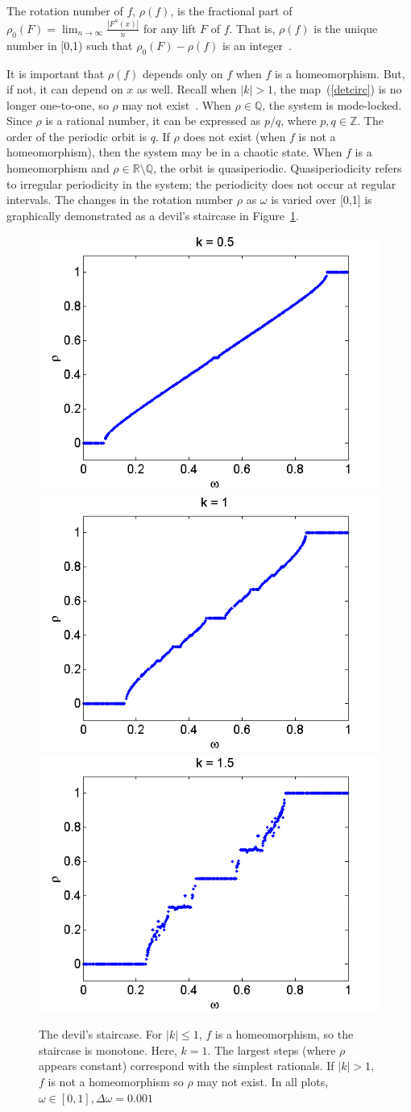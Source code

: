 \begin{singlespacing}
\begin{definition}\label{rho}
The rotation number of $f$, $\rho(f)$, is the fractional part of
$\rho_0(F) = \lim_{n \to \infty} \frac{|F^n(x)|}{n}$ for any lift $F$ of $f$. That is, $\rho(f)$ is the unique
number in [0,1) such that $\rho_0(F)-\rho(f)$ is an integer~\cite{devaney}.
\end{definition}
\end{singlespacing}

\noindent It is important that $\rho(f)$ depends only on $f$ when $f$
is a homeomorphism. But, if not, it can depend on $x$ as well. Recall when $|k|>1$,
the map~(\ref{detcirc}) is no longer one-to-one, so $\rho$
may not exist~\cite{devaney}. When $\rho \in \mathbb{Q}$, the system is mode-locked. Since
$\rho$ is a rational number, it can be expressed as $p/q$, where $p,q
\in \mathbb{Z}$. The order of the periodic orbit is $q$. If $\rho$
does not exist (when $f$ is not a homeomorphism), then the system may be in a chaotic
state. When $f$ is a homeomorphism and $\rho \in \mathbb{R} \setminus
\mathbb{Q}$, the orbit is quasiperiodic. Quasiperiodicity refers to irregular periodicity in the
system; the periodicity does
not occur at regular intervals. The changes in the rotation number $\rho$ as $\omega$ is
varied over [0,1] is graphically demonstrated as a devil's staircase
in Figure~\ref{fig:devil_det}. 
\begin{figure}[!h]
\caption[The devil's staircase for the deterministic circle map]{The devil's
  staircase. For $|k| \leq 1$, $f$ is a homeomorphism, so the
  staircase is monotone. Here, $k=1$. The largest steps (where $\rho$ appears
  constant) correspond with the simplest rationals. If $|k|>1$, $f$ is
  not a homeomorphism so $\rho$ may not exist. In all plots, $\omega \in [0,1],\Delta \omega = 0.001$}\label{fig:devil_det}
	\begin{center}
		\includegraphics[width=.33\textwidth]{figs/detcirc_devil_k05.png}\hfill
		\includegraphics[width=.33\textwidth]{figs/detcirc_devil_k1.png}\hfill
		\includegraphics[width=.33\textwidth]{figs/detcirc_devil_k15.png}
	\end{center}
\end{figure}

